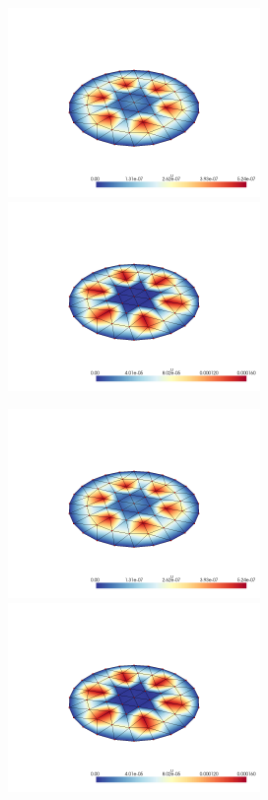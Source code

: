 \documentclass[
  11pt,
]{article}
\let\origfigure\figure
\let\endorigfigure\endfigure
\renewenvironment{figure}[1][2] {
    \expandafter\origfigure\expandafter[H]
} {
    \endorigfigure
}
\begin{document}
\begin{figure}
\caption{Finite element error in the L2 and H1 norms/seminorms, respectively for problem 1 over mesh number 1 using order 5 quadrature.}
\end{figure}

\includegraphics[width=0.5\textwidth,height=\textheight]{../img/mesh1-gauss08-L2.png}
\includegraphics[width=0.5\textwidth,height=\textheight]{../img/mesh1-gauss08-H1.png}

\begin{figure}
\caption{Finite element error in the L2 and H1 norms/seminorms, respectively for problem 1 over mesh number 1 using order 8 quadrature.}
\end{figure}

\includegraphics[width=0.5\textwidth,height=\textheight]{../img/mesh1-gauss13-L2.png}
\includegraphics[width=0.5\textwidth,height=\textheight]{../img/mesh1-gauss13-H1.png}
\end{document}
